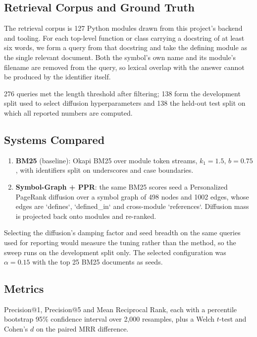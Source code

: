 \documentclass[10pt,twocolumn,letterpaper]{article}
\begin{document}
\subsection{Retrieval Corpus and Ground Truth}


The retrieval corpus is 127 Python modules drawn from this project's backend and tooling. For each top-level function or class carrying a docstring of at least six words, we form a query from that docstring and take the defining module as the single relevant document. Both the symbol's own name and its module's filename are removed from the query, so lexical overlap with the answer cannot be produced by the identifier itself.

276 queries met the length threshold after filtering; 138 form the development split used to select diffusion hyperparameters and 138 the held-out test split on which all reported numbers are computed.


\subsection{Systems Compared}


\begin{enumerate}
  \item \textbf{BM25} (baseline): Okapi BM25 over module token streams, $k_1 = 1.5$, $b = 0.75$, with identifiers split on underscores and case boundaries.
  \item \textbf{Symbol-Graph + PPR}: the same BM25 scores seed a Personalized PageRank diffusion over a symbol graph of 498 nodes and 1002 edges, whose edges are `defines`, `defined\_in` and cross-module `references`. Diffusion mass is projected back onto modules and re-ranked.
\end{enumerate}

Selecting the diffusion's damping factor and seed breadth on the same queries used for reporting would measure the tuning rather than the method, so the sweep runs on the development split only. The selected configuration was $\alpha = 0.15$ with the top 25 BM25 documents as seeds.


\subsection{Metrics}


Precision@1, Precision@5 and Mean Reciprocal Rank, each with a percentile bootstrap 95\% confidence interval over 2,000 resamples, plus a Welch $t$-test and Cohen's $d$ on the paired MRR difference.
\end{document}

